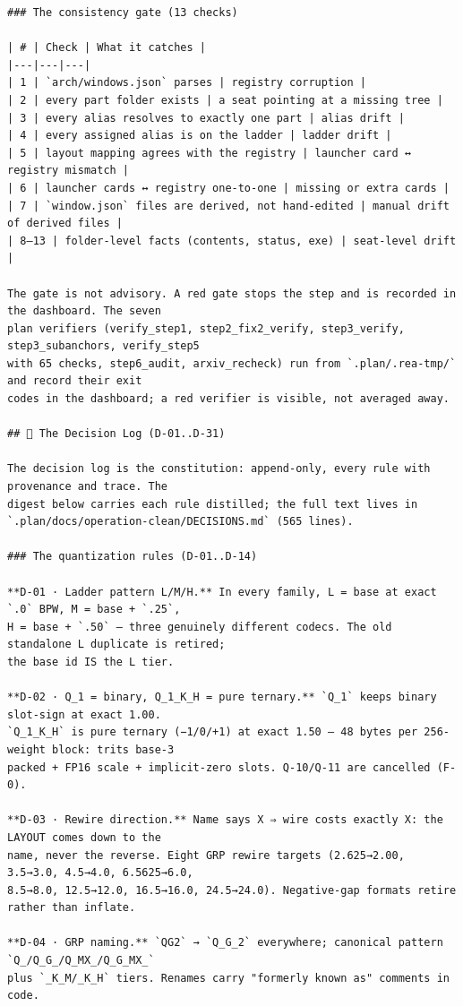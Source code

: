 \begin{Verbatim}[breaklines,breakanywhere,fontsize=\footnotesize]
### The consistency gate (13 checks)

| # | Check | What it catches |
|---|---|---|
| 1 | `arch/windows.json` parses | registry corruption |
| 2 | every part folder exists | a seat pointing at a missing tree |
| 3 | every alias resolves to exactly one part | alias drift |
| 4 | every assigned alias is on the ladder | ladder drift |
| 5 | layout mapping agrees with the registry | launcher card ↔ registry mismatch |
| 6 | launcher cards ↔ registry one-to-one | missing or extra cards |
| 7 | `window.json` files are derived, not hand-edited | manual drift of derived files |
| 8–13 | folder-level facts (contents, status, exe) | seat-level drift |

The gate is not advisory. A red gate stops the step and is recorded in the dashboard. The seven
plan verifiers (verify_step1, step2_fix2_verify, step3_verify, step3_subanchors, verify_step5
with 65 checks, step6_audit, arxiv_recheck) run from `.plan/.rea-tmp/` and record their exit
codes in the dashboard; a red verifier is visible, not averaged away.

## 📜 The Decision Log (D-01..D-31)

The decision log is the constitution: append-only, every rule with provenance and trace. The
digest below carries each rule distilled; the full text lives in
`.plan/docs/operation-clean/DECISIONS.md` (565 lines).

### The quantization rules (D-01..D-14)

**D-01 · Ladder pattern L/M/H.** In every family, L = base at exact `.0` BPW, M = base + `.25`,
H = base + `.50` — three genuinely different codecs. The old standalone L duplicate is retired;
the base id IS the L tier.

**D-02 · Q_1 = binary, Q_1_K_H = pure ternary.** `Q_1` keeps binary slot-sign at exact 1.00.
`Q_1_K_H` is pure ternary (−1/0/+1) at exact 1.50 — 48 bytes per 256-weight block: trits base-3
packed + FP16 scale + implicit-zero slots. Q-10/Q-11 are cancelled (F-0).

**D-03 · Rewire direction.** Name says X ⇒ wire costs exactly X: the LAYOUT comes down to the
name, never the reverse. Eight GRP rewire targets (2.625→2.00, 3.5→3.0, 4.5→4.0, 6.5625→6.0,
8.5→8.0, 12.5→12.0, 16.5→16.0, 24.5→24.0). Negative-gap formats retire rather than inflate.

**D-04 · GRP naming.** `QG2` → `Q_G_2` everywhere; canonical pattern `Q_/Q_G_/Q_MX_/Q_G_MX_`
plus `_K_M/_K_H` tiers. Renames carry "formerly known as" comments in code.


\end{Verbatim}
